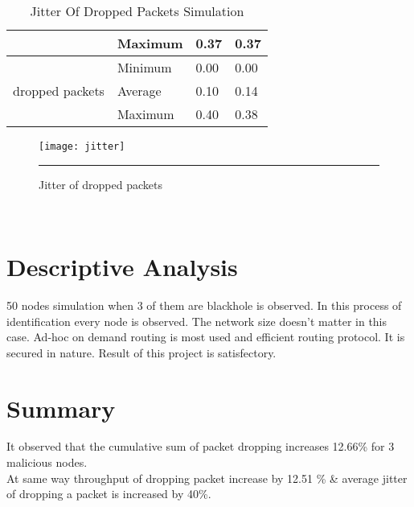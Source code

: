 \begin{table}[]
\begin{tabular}{|c|l|l|l|}
		& Maximum         & 0.37                    & 0.37                       \\ \hline
		\multirow{3}{*}{dropped packets}   & Minimum         & 0.00                    & 0.00                       \\ \cline{2-4}
		& Average         & 0.10                    & 0.14                       \\ \cline{2-4}
		& Maximum         & 0.40                    & 0.38                       \\ \hline
	\end{tabular}
	\caption{Jitter Of Dropped Packets Simulation}
	\label{tab:jitter}
\end{table}

\begin{figure}[htbp]
	\centering
	\texttt{[image: jitter]}
	\rule{35em}{0.5pt}
	\caption[Jitter Of Dropped Packets]{Jitter of dropped packets}
	\label{fig:jitter}
\end{figure}
\pagebreak\
\section{Descriptive Analysis}
50 nodes simulation when 3 of them are blackhole is observed. In this process of identification every node is observed. The network size doesn't matter in this case. Ad-hoc on demand routing is most used and efficient routing protocol. It is secured in nature. Result of this project is satisfectory.


\section{Summary}
It observed that the cumulative sum of packet dropping increases 12.66\% for 3 malicious nodes.\\At same way throughput of dropping packet increase by 12.51 \% \& average jitter of dropping a packet is increased by 40\%.